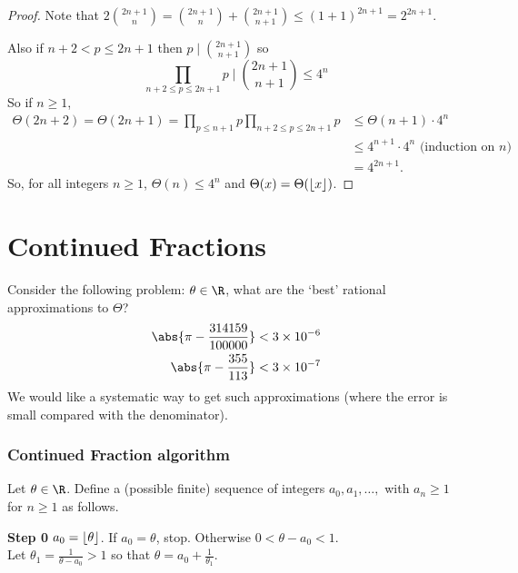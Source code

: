 \documentclass{article}
\DeclarePairedDelimiter\floor{\lfloor}{\rfloor}
\begin{document}
\begin{proof}
    Note that $
    2 \binom{2n+1}{n} = \binom{2n+1}{n} + \binom{2n+1}{n+1} \leq (1+1)^{2n+1} = 2^{2n+1}$.

    Also if $n+2 < p \leq 2n+1$ then $p \mid \binom{2n+1}{n+1}$ so
    \begin{equation*}
        \prod_{n+2 \leq p \leq 2n+1} p \mid \binom{2n+1}{n+1} \leq 4^n
    \end{equation*}
    So if $n \geq 1$,
    \begin{align*}
        \Theta(2n+2) = \Theta(2n+1) = \prod_{p \leq n+1} p \prod_{n+2 \leq p \leq 2n+1} p &\leq \Theta(n+1) \cdot 4^n \\
                                                                                          &\leq 4^{n+1} \cdot 4^n \text{ (induction on $n$)} \\
                                                                                          &=4^{2n+1}.
    \end{align*}
    So, for all integers $n \geq 1$, $\Theta(n) \leq 4^n$ and $\Theta(x) = \Theta(\floor{x})$.
\end{proof}

\clearpage
\section{Continued Fractions}
Consider the following problem: $\theta \in \R$, what are the `best' rational approximations to $\Theta$?
\begin{align*}
    \abs{\pi - \frac{314159}{100000}} &< 3 \times 10^{-6} \\
    \abs{\pi - \frac{355}{113}} &< 3 \times 10^{-7}
\end{align*}
We would like a systematic way to get such approximations (where the error is small compared with the denominator).

\subsubsection*{Continued Fraction algorithm}
Let $\theta \in \R$. Define a (possible finite) sequence of integers $a_0, a_1, \dotsc, $ with $a_n \geq 1$ for $n \geq 1$ as follows.

\textbf{Step 0}
$a_0 = \floor{\theta}$. If $a_0 = \theta$, stop. Otherwise $0 < \theta - a_0 < 1$. \\
Let $\theta_1 = \frac{1}{\theta - a_0} > 1$ so that $\theta = a_0 + \frac{1}{\theta_1}$.
\end{document}
